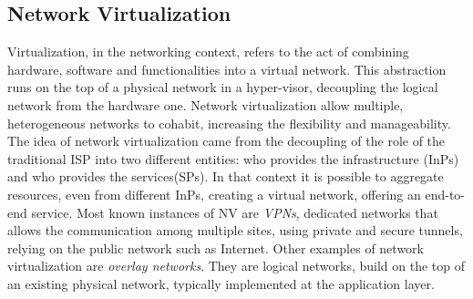 \subsection{Network Virtualization}
Virtualization, in the networking context, refers to the act of combining
hardware, software and functionalities into a virtual network. This abstraction
runs on the top of a physical network in a hyper-visor, decoupling the logical
network from the hardware one. Network virtualization allow multiple,
heterogeneous networks to cohabit, increasing the flexibility and manageability.
The idea of network virtualization came from the decoupling of the role of the
traditional ISP into two different entities: who provides the infrastructure
(InPs) and who provides the services(SPs). In that context it is possible to
aggregate resources, even from different InPs, creating a virtual network,
offering an end-to-end service. Most known instances of NV are \emph{VPNs},
dedicated networks that allows the communication among multiple sites, using
private and secure tunnels, relying on the public network such as Internet.
Other examples of network virtualization are \emph{overlay networks}. They are
logical networks, build on the top of an existing physical network, typically
implemented at the application layer. 

